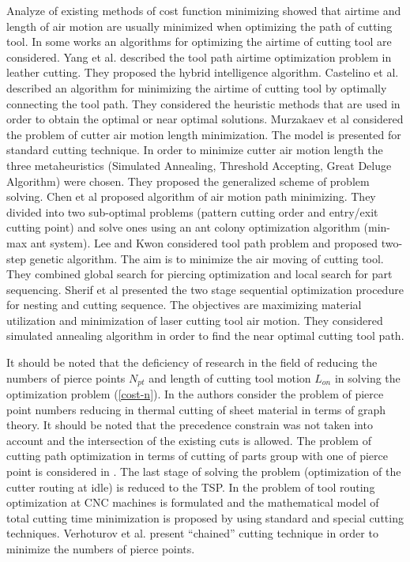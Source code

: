 \documentclass[runningheads]{llncs}
\begin{document}
Analyze of existing methods of cost function minimizing showed that
airtime and length of air motion are usually minimized when optimizing the path of cutting tool.
In some works an algorithms for optimizing the airtime of cutting tool are considered.
Yang et al. \cite{Yang2010}
described the tool path airtime optimization problem in leather cutting.
They proposed the hybrid intelligence algorithm.
Castelino et al. \cite{d2003tool}
described an algorithm for minimizing the airtime of cutting tool
by optimally connecting the tool path.
They considered the heuristic methods that are used
in order to obtain the optimal or near optimal solutions.
Murzakaev et al \cite{ru17} considered the problem of cutter air motion length minimization.
The model is presented for standard cutting technique.
In order to minimize cutter air motion length the three metaheuristics
(Simulated Annealing, Threshold Accepting, Great Deluge Algorithm) were chosen.
They proposed the generalized scheme of problem solving.
Chen et al \cite{Chen2014Dec}
proposed algorithm of air motion path minimizing.
They divided into two sub-optimal problems
(pattern cutting order and entry/exit cutting point)
and solve ones using an ant colony optimization algorithm (min-max ant system).
Lee and Kwon \cite{Lee2006Dec}
considered tool path problem and proposed two-step genetic algorithm.
The aim is to minimize the air moving of cutting tool.
They combined global search for piercing optimization and local search for part sequencing.
Sherif et al \cite{Sherif2014Oct}
presented the two stage sequential optimization procedure for nesting and cutting sequence.
The objectives are maximizing material utilization and minimization of laser cutting tool air motion.
They considered simulated annealing algorithm in order to find the near optimal cutting tool path.

It should be noted that
the deficiency of research in the field of reducing the numbers of pierce points $N_{pt}$
and length of cutting tool motion  $L_{on}$
in solving the optimization problem (\ref{cost-n}).
In \cite{Manber1984Jan}
the authors consider the problem of pierce point numbers reducing
in thermal cutting of sheet material in terms of graph theory.
It should be noted that the precedence constrain was not taken into account
and the intersection of the existing cuts is allowed.
The problem of cutting path optimization in terms of cutting of parts group
with one of pierce point is considered in \cite{ru22}.
The last stage of solving the problem
(optimization of the cutter routing at idle)
is reduced to the TSP.
In \cite{ru23} the problem of tool routing optimization at CNC machines is formulated
and the mathematical model of total cutting time minimization is proposed
by using standard and special cutting techniques.
Verhoturov et al. \cite{ru24} present ``chained'' cutting technique
in order to minimize the numbers of pierce points.
\end{document}
